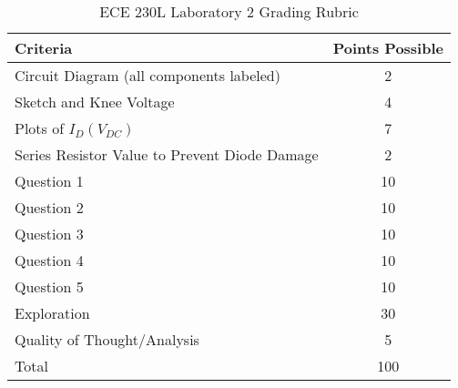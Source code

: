 \documentclass[12pt]{../manual}
\begin{document}
\newpage
{}
{}
\hspace{0pt}
\vfill %
\begin{table}[ht!]
\caption{ECE 230L Laboratory 2 Grading Rubric}
\centering
\begin{tabular}{l|c} \hline
Criteria & Points Possible \\ \hline \hline
Circuit Diagram (all components labeled) 			& 2 \\ \hline
Sketch and Knee Voltage								& 4 \\ \hline
Plots of $I_D(V_{DC})$								& 7 \\ \hline
Series Resistor Value to Prevent Diode Damage		& 2 \\ \hline
Question 1											& 10 \\ \hline
Question 2											& 10 \\ \hline
Question 3											& 10 \\ \hline
Question 4											& 10 \\ \hline
Question 5											& 10 \\ \hline
Exploration											& 30 \\ \hline
Quality of Thought/Analysis							& 5 \\ \hline \hline
Total												& 100 \\ \hline
\end{tabular}
\end{table}
\vfill %
\end{document}
